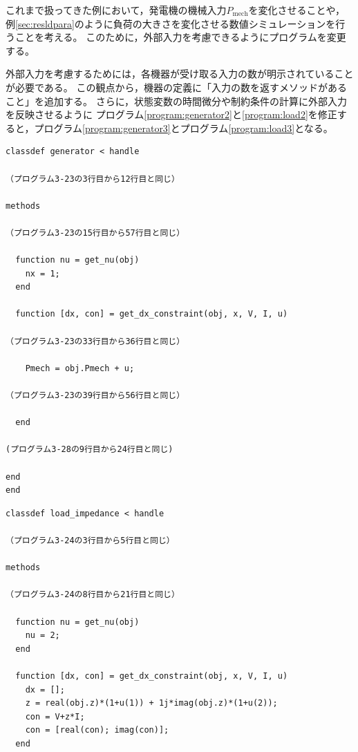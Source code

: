 \documentclass[tombow,dvipdfmx]{corona-a5-1.1}
\begin{document}
\begin{例}[入力信号に対する時間応答の数値計算]
これまで扱ってきた例において，発電機の機械入力$P_\mathrm{mech}$を変化させることや，例\ref{sec:resldpara}のように負荷の大きさを変化させる数値シミュレーションを行うことを考える。
このために，外部入力を考慮できるようにプログラムを変更する。

外部入力を考慮するためには，各機器が受け取る入力の数が明示されていることが必要である。
この観点から，機器の定義に「入力の数を返すメソッドがあること」を追加する。
さらに，状態変数の時間微分や制約条件の計算に外部入力を反映させるように
プログラム\ref{program:generator2}と\ref{program:load2}を修正すると，プログラム\ref{program:generator3}とプログラム\ref{program:load3}となる。

\smallskip
\begin{PROGRAMA}[count,title={generator.m}]\label{program:generator3}
  \begin{verbatim}
classdef generator < handle
  
（プログラム3-23の3行目から12行目と同じ）

methods

（プログラム3-23の15行目から57行目と同じ）

  function nu = get_nu(obj)
    nx = 1;
  end

  function [dx, con] = get_dx_constraint(obj, x, V, I, u)
    
（プログラム3-23の33行目から36行目と同じ）

    Pmech = obj.Pmech + u;

（プログラム3-23の39行目から56行目と同じ）

  end

(プログラム3-28の9行目から24行目と同じ)

end
end
\end{verbatim}
\end{PROGRAMA}

\begin{PROGRAMA}[count,title={load\_impedance.m}]\label{program:load3}
\begin{verbatim}
classdef load_impedance < handle
  
（プログラム3-24の3行目から5行目と同じ）

methods

（プログラム3-24の8行目から21行目と同じ）
  
  function nu = get_nu(obj)
    nu = 2;
  end

  function [dx, con] = get_dx_constraint(obj, x, V, I, u)
    dx = [];
    z = real(obj.z)*(1+u(1)) + 1j*imag(obj.z)*(1+u(2));
    con = V+z*I;
    con = [real(con); imag(con)];
  end


\end{verbatim}
\end{PROGRAMA}
\end{例}
\end{document}
